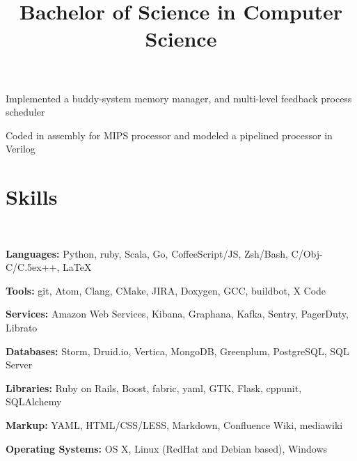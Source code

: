 \documentclass[12pt, tweaklist, line]{res}
\let\tempone\itemize
\let\temptwo\enditemize
\renewenvironment{itemize}{\tempone\vspace{-.15in}\setlength{\topsep}{0pt}\setlength{\itemsep}{3pt}\vspace{-.15in}}{\temptwo}
\def\Cplusplus{{\rm C\raise.5ex\hbox{\small ++}}}
\begin{document}
\begin{resume}
\title{Bachelor of Science in Computer Science}
\begin{position}
\begin{itemize}
\item Implemented a buddy-system memory manager, and multi-level feedback process scheduler
\item Coded in assembly for MIPS processor and modeled a pipelined processor in Verilog
\end{itemize}
\end{position}

\section{Skills}

~\\ %

\begin{itemize}
\item \textbf{Languages:} Python, ruby, Scala, Go, CoffeeScript/JS, Zsh/Bash, C/Obj-C/\Cplusplus, \LaTeX
\item \textbf{Tools:} git, Atom, Clang, CMake, JIRA, Doxygen, GCC, buildbot, X Code
\item \textbf{Services:} Amazon Web Services, Kibana, Graphana, Kafka, Sentry, PagerDuty, Librato
\item \textbf{Databases:} Storm, Druid.io, Vertica, MongoDB, Greenplum, PostgreSQL, SQL Server
\item \textbf{Libraries:} Ruby on Rails, Boost, fabric, yaml, GTK, Flask, cppunit, SQLAlchemy
\item \textbf{Markup:} YAML, HTML/CSS/LESS, Markdown, Confluence Wiki, mediawiki
\item \textbf{Operating Systems:} OS X, Linux (RedHat and Debian based), Windows
\end{itemize}

\end{resume}
\end{document}
